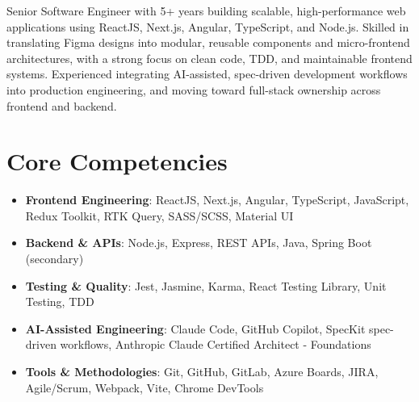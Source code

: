 \documentclass[11pt,a4paper,sans]{moderncv}
\begin{document}
\makecvtitle


\vspace{6pt}
\small{Senior Software Engineer with 5+ years building scalable, high-performance web applications using ReactJS, Next.js, Angular, TypeScript, and Node.js. Skilled in translating Figma designs into modular, reusable components and micro-frontend architectures, with a strong focus on clean code, TDD, and maintainable frontend systems. Experienced integrating AI-assisted, spec-driven development workflows into production engineering, and moving toward full-stack ownership across frontend and backend.}


\section{Core Competencies}
\vspace{1pt}
\begin{itemize}

\item \textbf{Frontend Engineering}: ReactJS, Next.js, Angular, TypeScript, JavaScript, Redux Toolkit, RTK Query, SASS/SCSS, Material UI

\item \textbf{Backend \& APIs}: Node.js, Express, REST APIs, Java, Spring Boot (secondary)

\item \textbf{Testing \& Quality}: Jest, Jasmine, Karma, React Testing Library, Unit Testing, TDD

\item \textbf{AI-Assisted Engineering}: Claude Code, GitHub Copilot, SpecKit spec-driven workflows, Anthropic Claude Certified Architect - Foundations

\item \textbf{Tools \& Methodologies}: Git, GitHub, GitLab, Azure Boards, JIRA, Agile/Scrum, Webpack, Vite, Chrome DevTools

\end{itemize}

\end{document}
